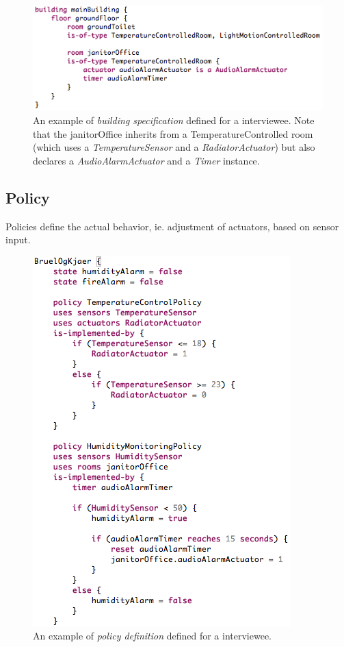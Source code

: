 \documentclass{llncs}
\begin{document}
\begin{figure}
  \centering
  \includegraphics[scale=.5]{dsl-building-definition.png}  
  \caption{An example of \textit{building specification} defined for a interviewee. Note that the janitorOffice inherits from a TemperatureControlled room (which uses a \textit{TemperatureSensor} and a \textit{RadiatorActuator}) but also declares a \textit{AudioAlarmActuator} and a \textit{Timer} instance.}
  \label{fig:dsl-building-definition}
\end{figure}

\subsection{Policy}\label{subsec:policies}
Policies define the actual behavior, ie. adjustment of actuators, based on sensor input. 

\begin{figure}
  \centering
    \includegraphics[scale=.5]{dsl-policy-definition.png} 
	\caption{An example of \textit{policy definition} defined for a interviewee.}
	\label{fig:dsl-policy-definition}
\end{figure}
\end{document}
